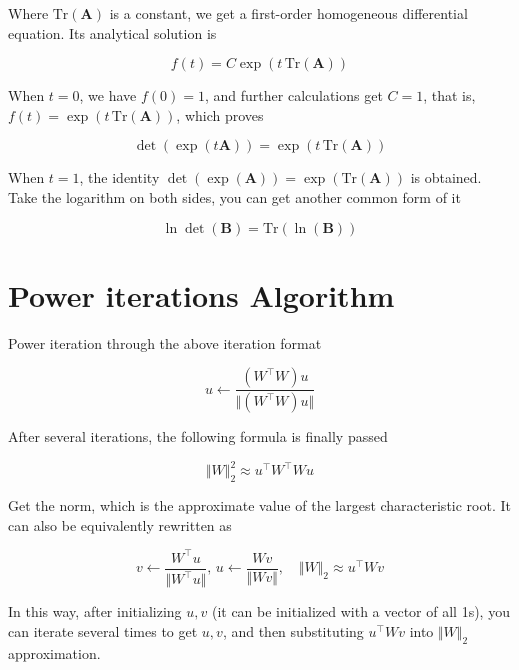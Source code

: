 \documentclass[final]{cvpr}
\begin{document}
\begin {appendix}
Where $\text{Tr}(\boldsymbol{A})$ is a constant, we get a first-order homogeneous differential equation. Its analytical solution is

\begin{equation}f(t)=C\exp(t\,\text{Tr}(\boldsymbol{A}))\end{equation}

When $t=0$, we have $f(0)=1$, and further calculations get $C=1$, that is, $f(t)=\exp(t\,\text{Tr}(\boldsymbol{ A}))$, which proves

\begin{equation}\det(\exp(t\boldsymbol{A}))=\exp(t\,\text{Tr}(\boldsymbol{A}))\end{equation}

When $t=1$, the identity $\det(\exp(\boldsymbol{A})) = \exp(\text{Tr}(\boldsymbol{A}))$ is obtained. Take the logarithm on both sides, you can get another common form of it

\begin{equation}\ln\det(\boldsymbol{B}) = \text{Tr}(\ln (\boldsymbol{B}))\end{equation}


\section{Power iterations Algorithm}
\label{app2}
Power iteration through the above iteration format

\begin{equation}u \leftarrow \frac{(W^{\top}W)u}{\Vert (W^{\top}W)u\Vert}\end{equation}

After several iterations, the following formula is finally passed

\begin{equation}\Vert W\Vert_2^2\approx u^{\top}W^{\top}Wu\end{equation}

Get the norm, which is the approximate value of the largest characteristic root. It can also be equivalently rewritten as

\begin{equation}v\leftarrow \frac{W^{\top}u}{\Vert W^{\top}u\Vert},\,u\leftarrow \frac{Wv}{\Vert Wv\Vert} ,\quad \Vert W\Vert_2 \approx u^{\top}Wv\end{equation}

In this way, after initializing $u,v$ (it can be initialized with a vector of all 1s), you can iterate several times to get $u,v$, and then substituting $u^{\top}Wv$ into $\Vert W\Vert_2$ approximation.


\end{appendix}
\end{document}
